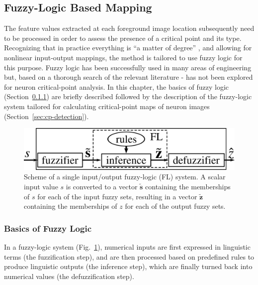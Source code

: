 \subsection{Fuzzy-Logic Based Mapping}
\label{subsec:flrb-detection} %
The feature values extracted at each foreground image location subsequently need to be processed in order to assess the presence of a critical point and its type. Recognizing that in practice everything is ``a matter of degree'' \cite{zadeh1975fuzzy}, and allowing for nonlinear input-output mappings, the method is tailored to use fuzzy logic for this purpose. Fuzzy logic has been successfully used in many areas of engineering \cite{mendel1995fuzzy} but, based on a thorough search of the relevant literature - has not been explored for neuron critical-point analysis. In this chapter, the basics of fuzzy logic (Section~\ref{sec:FL}) are briefly described followed by the description of the fuzzy-logic system tailored for calculating critical-point maps of neuron images (Section~\ref{sec:cp-detection}).
\begin{figure}
	\centering
	\includegraphics[width=0.5\columnwidth]{fig5}
	\caption{Scheme of a single input/output fuzzy-logic (FL) system. A scalar input value $s$ is converted to a vector $\tilde{\mathbf{s}}$ containing the memberships of $s$ for each of the input fuzzy sets, resulting in a vector $\tilde{\mathbf{z}}$ containing the memberships of $z$ for each of the output fuzzy sets.}
	\label{fig5}
\end{figure}
\subsubsection{Basics of Fuzzy Logic}
\label{sec:FL}
In a fuzzy-logic system (Fig.~\ref{fig5}), numerical inputs are first expressed in linguistic terms (the fuzzification step), and are then processed based on predefined rules to produce linguistic outputs (the inference step), which are finally turned back into numerical values (the defuzzification step).
